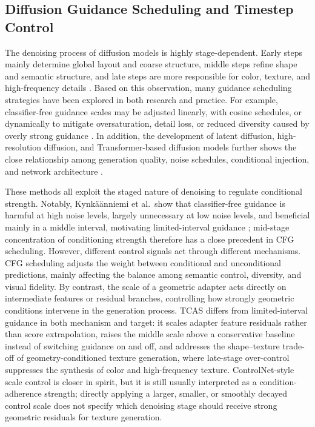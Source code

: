 \documentclass[times,twocolumn,final]{elsarticle}
\begin{document}
\subsection{Diffusion Guidance Scheduling and Timestep Control}
\label{subsec:guidance}

The denoising process of diffusion models is highly stage-dependent. Early steps mainly determine global layout and coarse structure, middle steps refine shape and semantic structure, and late steps are more responsible for color, texture, and high-frequency details \cite{ho2020ddpm,song2021ddim}. Based on this observation, many guidance scheduling strategies have been explored in both research and practice. For example, classifier-free guidance scales may be adjusted linearly, with cosine schedules, or dynamically to mitigate oversaturation, detail loss, or reduced diversity caused by overly strong guidance \cite{ho2022cfg,castillo2023adaptive}. In addition, the development of latent diffusion, high-resolution diffusion, and Transformer-based diffusion models further shows the close relationship among generation quality, noise schedules, conditional injection, and network architecture \cite{rombach2022ldm,esser2024scaling,blackforestlabs2024flux,loshchilov2019decoupled,cherti2023reproducible,nichol2022glide,saharia2022photorealistic,peebles2023scalable}.

These methods all exploit the staged nature of denoising to regulate conditional strength. Notably, Kynk\"a\"anniemi et al.\ show that classifier-free guidance is harmful at high noise levels, largely unnecessary at low noise levels, and beneficial mainly in a middle interval, motivating limited-interval guidance \cite{kynkanniemi2024limited}; mid-stage concentration of conditioning strength therefore has a close precedent in CFG scheduling. However, different control signals act through different mechanisms. CFG scheduling adjusts the weight between conditional and unconditional predictions, mainly affecting the balance among semantic control, diversity, and visual fidelity. By contrast, the scale of a geometric adapter acts directly on intermediate features or residual branches, controlling how strongly geometric conditions intervene in the generation process. TCAS differs from limited-interval guidance in both mechanism and target: it scales adapter feature residuals rather than score extrapolation, raises the middle scale above a conservative baseline instead of switching guidance on and off, and addresses the shape--texture trade-off of geometry-conditioned texture generation, where late-stage over-control suppresses the synthesis of color and high-frequency texture. ControlNet-style scale control is closer in spirit, but it is still usually interpreted as a condition-adherence strength; directly applying a larger, smaller, or smoothly decayed control scale does not specify which denoising stage should receive strong geometric residuals for texture generation.
\end{document}
